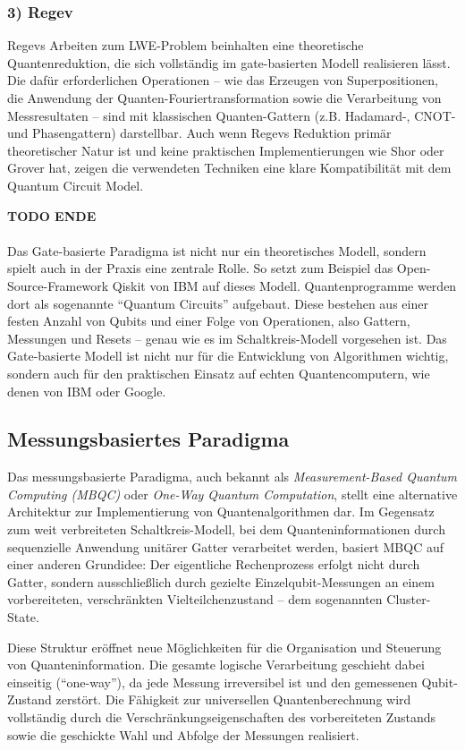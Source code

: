 \subsubsection*{3) Regev}
Regevs Arbeiten zum LWE-Problem beinhalten eine theoretische Quantenreduktion, die sich vollständig im gate-basierten Modell realisieren lässt. Die dafür erforderlichen Operationen – wie das Erzeugen von Superpositionen, die Anwendung der Quanten-Fouriertransformation sowie die Verarbeitung von Messresultaten – sind mit klassischen Quanten-Gattern (z.B. Hadamard-, CNOT- und Phasengattern) darstellbar. Auch wenn Regevs Reduktion primär theoretischer Natur ist und keine praktischen Implementierungen wie Shor oder Grover hat, zeigen die verwendeten Techniken eine klare Kompatibilität mit dem Quantum Circuit Model. \autocite{regev_lattices_2024}

\textbf{TODO ENDE}
\\
\\
Das Gate-basierte Paradigma ist nicht nur ein theoretisches Modell, sondern spielt auch in der Praxis eine zentrale Rolle. So setzt zum Beispiel das Open-Source-Framework Qiskit von IBM auf dieses Modell. Quantenprogramme werden dort als sogenannte \enquote{Quantum Circuits} aufgebaut. Diese bestehen aus einer festen Anzahl von Qubits und einer Folge von Operationen, also Gattern, Messungen und Resets -- genau wie es im Schaltkreis-Modell vorgesehen ist. Das Gate-basierte Modell ist nicht nur für die Entwicklung von Algorithmen wichtig, sondern auch für den praktischen Einsatz auf echten Quantencomputern, wie denen von IBM oder Google.

\subsection{Messungsbasiertes Paradigma}
Das messungsbasierte Paradigma, auch bekannt als \textit{Measurement-Based Quantum Computing (MBQC)} oder \textit{One-Way Quantum Computation}, stellt eine alternative Architektur zur Implementierung von Quantenalgorithmen dar. Im Gegensatz zum weit verbreiteten Schaltkreis-Modell, bei dem Quanteninformationen durch sequenzielle Anwendung unitärer Gatter verarbeitet werden, basiert MBQC auf einer anderen Grundidee: Der eigentliche Rechenprozess erfolgt nicht durch Gatter, sondern ausschließlich durch gezielte Einzelqubit-Messungen an einem vorbereiteten, verschränkten Vielteilchenzustand – dem sogenannten Cluster-State.

Diese Struktur eröffnet neue Möglichkeiten für die Organisation und Steuerung von Quanteninformation. Die gesamte logische Verarbeitung geschieht dabei einseitig (\enquote{one-way}), da jede Messung irreversibel ist und den gemessenen Qubit-Zustand zerstört. Die Fähigkeit zur universellen Quantenberechnung wird vollständig durch die Verschränkungseigenschaften des vorbereiteten Zustands sowie die geschickte Wahl und Abfolge der Messungen realisiert. \autocite[2-4]{briegelMeasurementbasedQuantumComputation2009}

